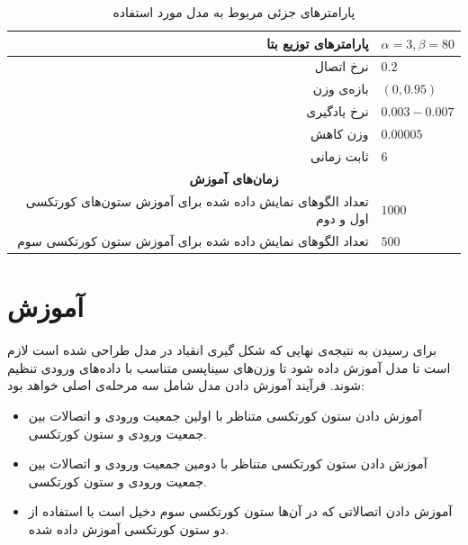 \documentclass[12pt]{report}
\begin{document}
\begin{table}[p]
{\begin{tabular}{|rrrl|}
		\multicolumn{3}{|r|}{پارامتر‌های توزیع بتا}                                               & $\alpha=3, \beta=80$           \\ \hline
		\multicolumn{3}{|r|}{نرخ اتصال}                                                           & $0.2$                 \\ \hline
		\multicolumn{3}{|r|}{بازه‌ی وزن}                                                          & $(0, 0.95)$           \\ \hline
		\multicolumn{3}{|r|}{نرخ یادگیری}                                                         & $0.003 - 0.007$       \\ \hline
		\multicolumn{3}{|r|}{وزن کاهش}                                                            & $0.00005$             \\ \hline
		\multicolumn{3}{|r|}{ثابت زمانی}                                                          & $6$                   \\ \hline
		\multicolumn{4}{|c|}{\textbf{زمان‌های آموزش}}                                                                   \\ \hline
		\multicolumn{3}{|r|}{تعداد الگو‌های نمایش داده شده برای آموزش ستون‌های کورتکسی اول و دوم} & $1000$                \\ \hline
		\multicolumn{3}{|r|}{تعداد الگو‌های نمایش داده شده برای آموزش ستون کورتکسی سوم}           & $500$                 \\ \hline
\end{tabular}}
\caption{\label{table:parameters-details}پارامتر‌های جزئی مربوط به مدل مورد استفاده}
\end{table}





	
	\section{آموزش}
	برای رسیدن به نتیجه‌ی نهایی که شکل گیری انقیاد در مدل طراحی شده است لازم است تا مدل آموزش داده شود تا وزن‌های سیناپسی متناسب با داده‌های ورودی تنظیم شوند. 
	فرآیند آموزش دادن مدل شامل سه مرحله‌ی اصلی خواهد بود:
	
	\begin{itemize}
		\item آموزش دادن ستون کورتکسی متناظر با اولین جمعیت ورودی و اتصالات بین جمعیت ورودی و ستون کورتکسی.
		\item آموزش دادن ستون کورتکسی متناظر با دومین جمعیت ورودی و اتصالات بین جمعیت ورودی و ستون کورتکسی.
		\item آموزش دادن اتصالاتی که در آن‌ها ستون کورتکسی سوم دخیل است با استفاده از دو ستون کورتکسی آموزش داده شده.
	\end{itemize}
\end{document}
